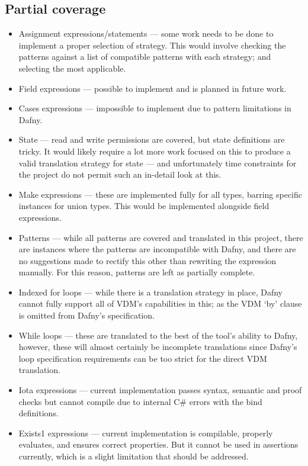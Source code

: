 \documentclass{entcs}
\begin{document}
\subsection{Partial coverage}
\begin{itemize}
    \item Assignment expressions/statements --- some work needs to be done to implement a proper selection of strategy. This would involve checking the patterns against a list of compatible patterns with each strategy; and selecting the most applicable.
    \item Field expressions --- possible to implement and is planned in future work.
    \item Cases expressions --- impossible to implement due to pattern limitations in Dafny.
    \item State --- read and write permissions are covered, but state definitions are tricky. It would likely require a lot more work focused on this to produce a valid translation strategy for state --- and unfortunately time constraints for the project do not permit such an in-detail look at this.
    \item Make expressions --- these are implemented fully for all types, barring specific instances for union types. This would be implemented alongside field expressions.    
    \item Patterns --- while all patterns are covered and translated in this project, there are instances where the patterns are incompatible with Dafny, and there are no suggestions made to rectify this other than rewriting the expression manually. For this reason, patterns are left as partially complete.
    \item Indexed for loops --- while there is a translation strategy in place, Dafny cannot fully support all of VDM's capabilities in this; as the VDM `by' clause is omitted from Dafny's specification. 
    \item While loops --- these are translated to the best of the tool's ability to Dafny, however, these will almost certainly be incomplete translations since Dafny's loop specification requirements can be too strict for the direct VDM translation.
    \item Iota expressions --- current implementation passes syntax, semantic and proof checks but cannot compile due to internal C\# errors with the bind definitions.
    \item Exists1 expressions --- current implementation is compilable, properly evaluates, and ensures correct properties. But it cannot be used in assertions currently, which is a slight limitation that should be addressed.
\end{itemize}
\end{document}

